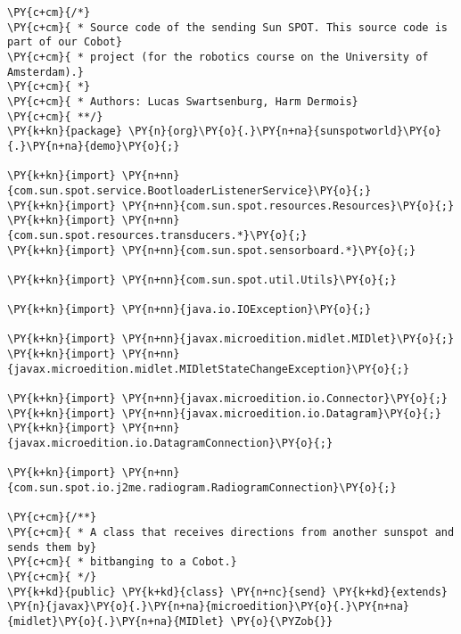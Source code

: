 \begin{Verbatim}[commandchars=\\\{\}]
\PY{c+cm}{/*}
\PY{c+cm}{ * Source code of the sending Sun SPOT. This source code is part of our Cobot}
\PY{c+cm}{ * project (for the robotics course on the University of Amsterdam).}
\PY{c+cm}{ *}
\PY{c+cm}{ * Authors: Lucas Swartsenburg, Harm Dermois}
\PY{c+cm}{ **/}
\PY{k+kn}{package} \PY{n}{org}\PY{o}{.}\PY{n+na}{sunspotworld}\PY{o}{.}\PY{n+na}{demo}\PY{o}{;}

\PY{k+kn}{import} \PY{n+nn}{com.sun.spot.service.BootloaderListenerService}\PY{o}{;}
\PY{k+kn}{import} \PY{n+nn}{com.sun.spot.resources.Resources}\PY{o}{;}
\PY{k+kn}{import} \PY{n+nn}{com.sun.spot.resources.transducers.*}\PY{o}{;}
\PY{k+kn}{import} \PY{n+nn}{com.sun.spot.sensorboard.*}\PY{o}{;}

\PY{k+kn}{import} \PY{n+nn}{com.sun.spot.util.Utils}\PY{o}{;}

\PY{k+kn}{import} \PY{n+nn}{java.io.IOException}\PY{o}{;}

\PY{k+kn}{import} \PY{n+nn}{javax.microedition.midlet.MIDlet}\PY{o}{;}
\PY{k+kn}{import} \PY{n+nn}{javax.microedition.midlet.MIDletStateChangeException}\PY{o}{;}

\PY{k+kn}{import} \PY{n+nn}{javax.microedition.io.Connector}\PY{o}{;}
\PY{k+kn}{import} \PY{n+nn}{javax.microedition.io.Datagram}\PY{o}{;}
\PY{k+kn}{import} \PY{n+nn}{javax.microedition.io.DatagramConnection}\PY{o}{;}

\PY{k+kn}{import} \PY{n+nn}{com.sun.spot.io.j2me.radiogram.RadiogramConnection}\PY{o}{;}

\PY{c+cm}{/**}
\PY{c+cm}{ * A class that receives directions from another sunspot and sends them by}
\PY{c+cm}{ * bitbanging to a Cobot.}
\PY{c+cm}{ */}
\PY{k+kd}{public} \PY{k+kd}{class} \PY{n+nc}{send} \PY{k+kd}{extends} \PY{n}{javax}\PY{o}{.}\PY{n+na}{microedition}\PY{o}{.}\PY{n+na}{midlet}\PY{o}{.}\PY{n+na}{MIDlet} \PY{o}{\PYZob{}}


\end{Verbatim}
